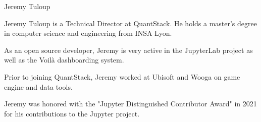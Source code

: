 \begin{participant}[type=leadPI,PM=6,gender=male]{Jeremy Tuloup}

  Jeremy Tuloup is a Technical Director at QuantStack. He holds a master's degree in computer science and engineering from INSA Lyon.

  As an open source developer, Jeremy is very active in the JupyterLab project as well as the Voilà dashboarding system.

  Prior to joining QuantStack, Jeremy worked at Ubisoft and Wooga on game engine and data tools.

  Jeremy was honored with the "Jupyter Distinguished Contributor Award" in 2021 for his contributions to the Jupyter project.
\end{participant}

